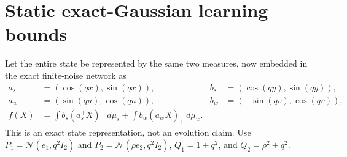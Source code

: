 \documentclass[11pt]{article}
\numberwithin{equation}{section}
\theoremstyle{remark}\newtheorem{remark}[theorem]{Remark}
\newcommand{\1}{\mathbf 1}
\begin{document}
\section{Static exact-Gaussian learning bounds}
\label{inc:AN06:v2:staticlearning}
Let the entire state be represented by the same two measures, now embedded
in the exact finite-noise network as
\begin{align*}
 a_s&=(\cos(qx),\sin(qx)),& b_s&=(\cos(qy),\sin(qy)),\\
 a_w&=(\sin(qu),\cos(qu)),& b_w&=(-\sin(qv),\cos(qv)),\\
 f(X)&=\int b_s(a_s^\top X)_+\,d\mu_s
       +\int b_w(a_w^\top X)_+\,d\mu_w.
\end{align*}
This is an exact state representation, not an evolution claim.
Use $P_1=\mathcal N(e_1,q^2I_2)$ and
$P_2=\mathcal N(\rho e_2,q^2I_2)$,
$Q_1=1+q^2$, and $Q_2=\rho^2+q^2$.
\end{document}
